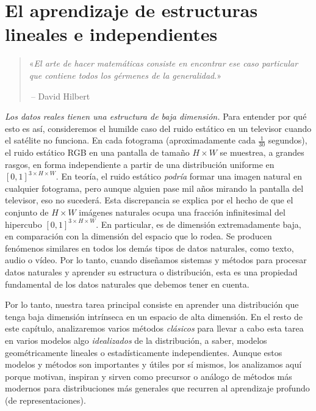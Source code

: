 \documentclass[../../book-main.tex]{subfiles}
\begin{document}
\chapter{El aprendizaje de estructuras lineales e independientes}
\label{ch:classic-models}

\begin{quote}
    \hfill  «{\em El arte de hacer matemáticas consiste en encontrar 
    ese caso particular que contiene todos los gérmenes de la generalidad}.»

    $~$\hfill -- David Hilbert
\end{quote}
\vspace{5mm}

\textit{Los datos reales tienen una estructura de baja dimensión.} 
Para entender por qué esto es así, consideremos el humilde caso del 
ruido estático en un televisor cuando el satélite no funciona.
En cada fotograma (aproximadamente cada \(\frac{1}{30}\) segundos), 
el ruido estático RGB en una pantalla de tamaño \(H \times W\) se 
muestrea, a grandes rasgos, en forma independiente a partir de una 
distribución uniforme en \([0, 1]^{3 \times H \times W}\). En teoría, el
ruido estático \textit{podría} formar una imagen natural en cualquier fotograma,
pero aunque alguien pase mil años mirando la pantalla del televisor,
eso no sucederá. Esta discrepancia se explica por el hecho de que el conjunto de
\(H \times W\) imágenes naturales ocupa una fracción infinitesimal
del hipercubo \([0, 1]^{3 \times H \times W}\). En particular,
es de dimensión extremadamente baja, en comparación con la
dimensión del espacio que lo rodea. Se producen fenómenos similares 
en todos los demás tipos de datos naturales, como texto, audio o vídeo.
Por lo tanto, cuando diseñamos sistemas y métodos para procesar datos 
naturales y aprender su estructura o distribución, esta es una propiedad 
fundamental de los datos naturales que debemos tener en cuenta. %

Por lo tanto, nuestra tarea principal consiste en aprender una distribución que tenga baja
dimensión intrínseca en un espacio de alta dimensión. En el resto de
este capítulo, analizaremos varios métodos \textit{clásicos} para
llevar a cabo esta tarea en varios modelos algo {\em idealizados} de
la distribución, a saber, modelos geométricamente lineales o
estadísticamente independientes. Aunque estos modelos y métodos son
importantes y útiles por sí mismos, los analizamos aquí porque
motivan, inspiran y sirven como precursor o análogo de métodos más
modernos para distribuciones más generales que recurren al aprendizaje profundo
(de representaciones).
\end{document}
